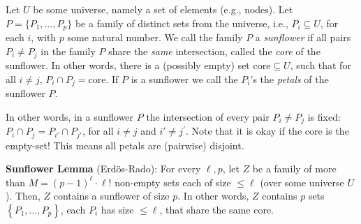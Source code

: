 \begin{svgraybox}
\begin{definition}[Sunflower] Let $U$ be some universe, namely a set of elements (e.g., nodes). Let $P=\{P_1,\dots,P_p\}$ be a family of distinct sets from the universe, i.e., $P_i\subseteq U$, for each $i$, with $p$ some natural number. 
We call the family $P$ a \emph{sunflower} if  all pairs $P_i \neq P_j$ in the family $P$ share the \emph{same} intersection, called the \emph{core} of the sunflower.
In other words, there is a (possibly empty) set $\mathrm{core}\subseteq U$, such that for all $i\neq j$,  $ P_i\cap P_j = \mathrm{core}$.
If $P$ is a sunflower we call the $P_i$'s the \emph{petals} of the sunflower $P$.
\end{definition}
\end{svgraybox}
In other words, in a sunflower $P$ the intersection of every pair $P_i \neq P_j$ is fixed: $P_i \cap P_j=P_{i'} \cap P_{j'}$, for all $i \neq j $ and $ i' \neq j^{\prime}$.
Note that it is okay if the core is the empty-set! This means all petals are (pairwise) disjoint.


\begin{svgraybox}
\textbf{Sunflower Lemma} (Erd\"os-Rado): For every $\ell, p$, let $Z$ be a family of more than $M=(p-1)^\ell \cdot \ell!$ non-empty sets each of size $\leq \ell$ (over some universe $U$). Then, $Z$ contains a sunflower of size $p$. In other words, $Z$ contains $p$ sets $\left\{P_1, \ldots, P_p\right\}$, each $P_i$ has size $\leq \ell$, that share the same core. 
\end{svgraybox}



